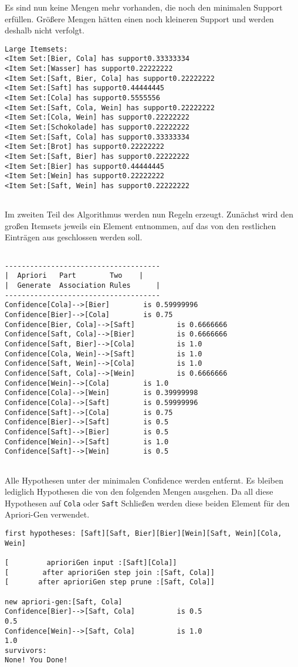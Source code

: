 \documentclass[a4paper]{article}
\begin{document}
Es sind nun keine Mengen mehr vorhanden, die noch den minimalen Support erfüllen. Größere Mengen hätten einen noch kleineren Support und werden deshalb nicht verfolgt.
\begin{lstlisting}
Large Itemsets:
<Item Set:[Bier, Cola] has support0.33333334
<Item Set:[Wasser] has support0.22222222
<Item Set:[Saft, Bier, Cola] has support0.22222222
<Item Set:[Saft] has support0.44444445
<Item Set:[Cola] has support0.5555556
<Item Set:[Saft, Cola, Wein] has support0.22222222
<Item Set:[Cola, Wein] has support0.22222222
<Item Set:[Schokolade] has support0.22222222
<Item Set:[Saft, Cola] has support0.33333334
<Item Set:[Brot] has support0.22222222
<Item Set:[Saft, Bier] has support0.22222222
<Item Set:[Bier] has support0.44444445
<Item Set:[Wein] has support0.22222222
<Item Set:[Saft, Wein] has support0.22222222


\end{lstlisting}
Im zweiten Teil des Algorithmus werden nun Regeln erzeugt. Zunächst wird den großen Itemsets jeweils ein Element entnommen, auf das von den restlichen Einträgen aus geschlossen werden soll. 
\begin{lstlisting}

-------------------------------------
|  Apriori 	 Part 		 Two	|
|  Generate  Association Rules		|
-------------------------------------
Confidence[Cola]-->[Bier] 		 is 0.59999996
Confidence[Bier]-->[Cola] 		 is 0.75
Confidence[Bier, Cola]-->[Saft] 		 is 0.6666666
Confidence[Saft, Cola]-->[Bier] 		 is 0.6666666
Confidence[Saft, Bier]-->[Cola] 		 is 1.0
Confidence[Cola, Wein]-->[Saft] 		 is 1.0
Confidence[Saft, Wein]-->[Cola] 		 is 1.0
Confidence[Saft, Cola]-->[Wein] 		 is 0.6666666
Confidence[Wein]-->[Cola] 		 is 1.0
Confidence[Cola]-->[Wein] 		 is 0.39999998
Confidence[Cola]-->[Saft] 		 is 0.59999996
Confidence[Saft]-->[Cola] 		 is 0.75
Confidence[Bier]-->[Saft] 		 is 0.5
Confidence[Saft]-->[Bier] 		 is 0.5
Confidence[Wein]-->[Saft] 		 is 1.0
Confidence[Saft]-->[Wein] 		 is 0.5


\end{lstlisting}
Alle Hypothesen unter der minimalen Confidence werden entfernt. Es bleiben lediglich Hypothesen die von den folgenden Mengen ausgehen. Da all diese Hypothesen auf \texttt{Cola} oder \texttt{Saft} Schließen werden diese beiden Element für den Apriori-Gen verwendet.
\begin{lstlisting}
first hypotheses: [Saft][Saft, Bier][Bier][Wein][Saft, Wein][Cola, Wein]

[ 		  aprioriGen input :[Saft][Cola]]
[ 		 after aprioriGen step join :[Saft, Cola]]
[ 		after aprioriGen step prune :[Saft, Cola]]

new apriori-gen:[Saft, Cola]
Confidence[Bier]-->[Saft, Cola] 		 is 0.5
0.5
Confidence[Wein]-->[Saft, Cola] 		 is 1.0
1.0
survivors: 
None! You Done!



\end{lstlisting}
\end{document}
